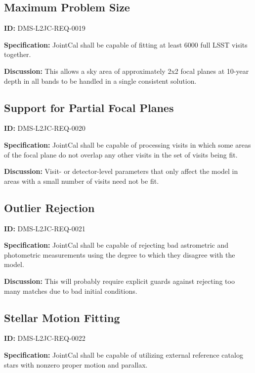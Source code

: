 \documentclass[SE,toc,lsstdraft]{lsstdoc}
\begin{document}
\subsection{Maximum Problem Size}

\label{DMS-L2JC-REQ-0019}
\textbf{ID:} DMS-L2JC-REQ-0019

\textbf{Specification:}
JointCal shall be capable of fitting at least 6000 full LSST visits together.

\textbf{Discussion:}
This allows a sky area of approximately 2x2 focal planes at 10-year depth in all bands to be handled in a single consistent solution.

\subsection{Support for Partial Focal Planes}

\label{DMS-L2JC-REQ-0020}
\textbf{ID:} DMS-L2JC-REQ-0020

\textbf{Specification:}
JointCal shall be capable of processing visits in which some areas of the focal plane do not overlap any other visits in the set of visits being fit.

\textbf{Discussion:}
Visit- or detector-level parameters that only affect the model in areas with a small number of visits need not be fit.

\subsection{Outlier Rejection}

\label{DMS-L2JC-REQ-0021}
\textbf{ID:} DMS-L2JC-REQ-0021

\textbf{Specification:}
JointCal shall be capable of rejecting bad astrometric and photometric measurements using the degree to which they disagree with the model.

\textbf{Discussion:}
This will probably require explicit guards against rejecting too many matches due to bad initial conditions.

\subsection{Stellar Motion Fitting}

\label{DMS-L2JC-REQ-0022}
\textbf{ID:} DMS-L2JC-REQ-0022

\textbf{Specification:}
JointCal shall be capable of utilizing external reference catalog stars with nonzero proper motion and parallax.
\end{document}
